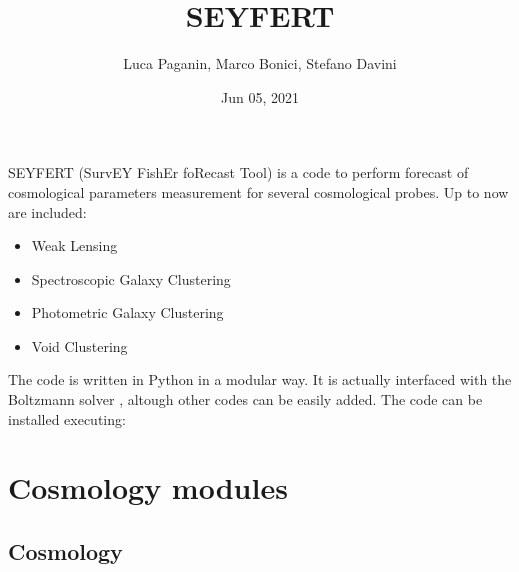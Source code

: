 \documentclass[letterpaper,10pt,english]{sphinxmanual}
\title{SEYFERT}
\date{Jun 05, 2021}
\author{Luca Paganin, Marco Bonici, Stefano Davini}
\begin{document}
\pagestyle{empty}
\sphinxmaketitle
\pagestyle{plain}
\sphinxtableofcontents
\pagestyle{normal}
\label{\detokenize{index::doc}}


\sphinxAtStartPar
SEYFERT (SurvEY FishEr foRecast Tool) is a code to perform forecast of cosmological parameters measurement for several cosmological probes. Up to now are included:
\begin{itemize}
\item {} 
\sphinxAtStartPar
Weak Lensing

\item {} 
\sphinxAtStartPar
Spectroscopic Galaxy Clustering

\item {} 
\sphinxAtStartPar
Photometric Galaxy Clustering

\item {} 
\sphinxAtStartPar
Void Clustering

\end{itemize}

\sphinxAtStartPar
The code is written in Python in a modular way. It is actually interfaced with the Boltzmann solver , altough other codes can be easily added. The code can be installed executing:

\begin{sphinxVerbatim}[commandchars=\\\{\}]
\end{sphinxVerbatim}


\chapter{Cosmology modules}
\label{\detokenize{index:cosmology-modules}}

\section{Cosmology}
\label{\detokenize{cosmology:cosmology}}\label{\detokenize{cosmology::doc}}
\end{document}
